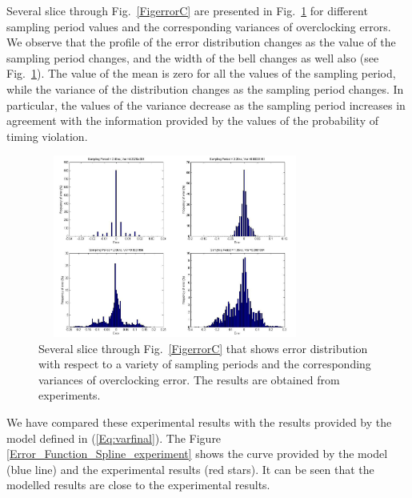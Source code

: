 \documentclass[journal]{IEEEtran}
\begin{document}
Several slice through Fig.~\ref{FigerrorC} are presented in Fig.~\ref{Fig:gaussianOnlinedistr} for different sampling period values and the corresponding variances of overclocking errors. We observe that the profile of the error distribution changes as the value of the sampling period changes, and the width of the bell changes as well also (see Fig.~\ref{Fig:gaussianOnlinedistr}). The value of the mean is zero for all the values of the sampling period, while the variance of the distribution changes as the sampling period changes. In particular, the values of the variance decrease as the sampling period increases in agreement with the information provided by the values of the probability of timing violation.\\



\begin{figure}[tbp]
\centering
	\includegraphics[width=9cm,height=6cm]{./Figures/gaussianOnlinedistr}
	\caption{Several slice through Fig.~\ref{FigerrorC} that shows error distribution with respect to a variety of sampling periods and the corresponding variances of overclocking error. The results are obtained from experiments.}
	\label{Fig:gaussianOnlinedistr}
\end{figure}




We have compared these experimental results with the results provided by the model defined in (\ref{Eq:varfinal}). The Figure \ref{Error_Function_Spline_experiment} shows the curve provided by the model (blue line) and the experimental results (red stars). It can be seen that the modelled results are close to the experimental results. 

\end{document}
